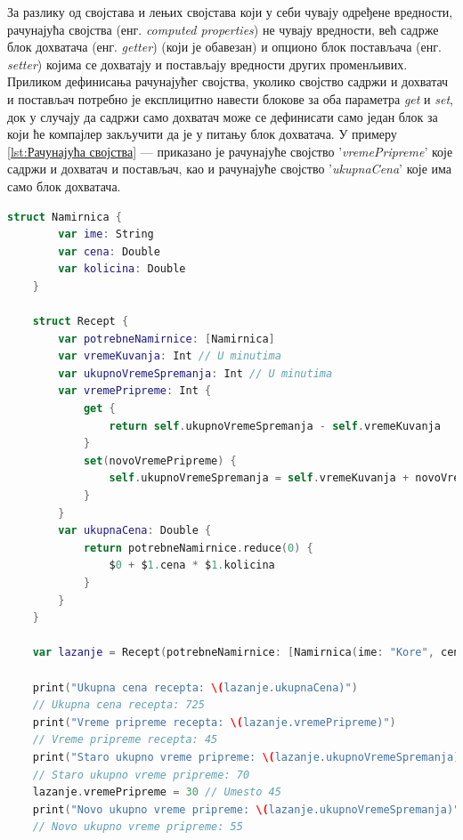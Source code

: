 \documentclass[12pt,oneside]{memoir}
\begin{document}
\indent За разлику од својстава и лењих својстава који у себи чувају одређене вредности, рачунајућа својства (енг. \textit{computed properties}) не чувају вредности, већ садрже блок дохватача (енг. \textit{getter}) (који је обавезан) и опционо блок постављача (енг. \textit{setter}) којима се дохватају и постављају вредности других променљивих. Приликом дефинисања рачунајућег својства, уколико својство садржи и дохватач и постављач потребно је експлицитно навести блокове за оба параметра \textit{get} и \textit{set}, док у случају да садржи само дохватач може се дефинисати само један блок за који ће компајлер закључити да је у питању блок дохватача. У примеру \ref{lst:Рачунајућа својства} ---  приказано је рачунајуће својство '\textit{vremePripreme}' које садржи и дохватач и постављач, као и рачунајуће својство '\textit{ukupnaCena}' које има само блок дохватача.

\begin{lstlisting}[caption=\textit{{Рачунајућа својства}}, label={lst:Рачунајућа својства}, language=Swift, frame=single]
    struct Namirnica {
        var ime: String
        var cena: Double
        var kolicina: Double
    }
    
    struct Recept {
        var potrebneNamirnice: [Namirnica]
        var vremeKuvanja: Int // U minutima
        var ukupnoVremeSpremanja: Int // U minutima
        var vremePripreme: Int {
            get {
                return self.ukupnoVremeSpremanja - self.vremeKuvanja
            }
            set(novoVremePripreme) {
                self.ukupnoVremeSpremanja = self.vremeKuvanja + novoVremePripreme
            }
        }
        var ukupnaCena: Double {
            return potrebneNamirnice.reduce(0) {
                $0 + $1.cena * $1.kolicina
            }
        }
    }
    
    var lazanje = Recept(potrebneNamirnice: [Namirnica(ime: "Kore", cena: 250, kolicina: 1), Namirnica(ime: "Mleveno meso", cena: 500, kolicina: 0.75), Namirnica(ime: "Sos", cena: 100, kolicina: 1)], vremeKuvanja: 25, ukupnoVremeSpremanja: 70)
    
    print("Ukupna cena recepta: \(lazanje.ukupnaCena)")
    // Ukupna cena recepta: 725
    print("Vreme pripreme recepta: \(lazanje.vremePripreme)")
    // Vreme pripreme recepta: 45
    print("Staro ukupno vreme pripreme: \(lazanje.ukupnoVremeSpremanja)")
    // Staro ukupno vreme pripreme: 70
    lazanje.vremePripreme = 30 // Umesto 45
    print("Novo ukupno vreme pripreme: \(lazanje.ukupnoVremeSpremanja)")
    // Novo ukupno vreme pripreme: 55
\end{lstlisting}
\end{document}
